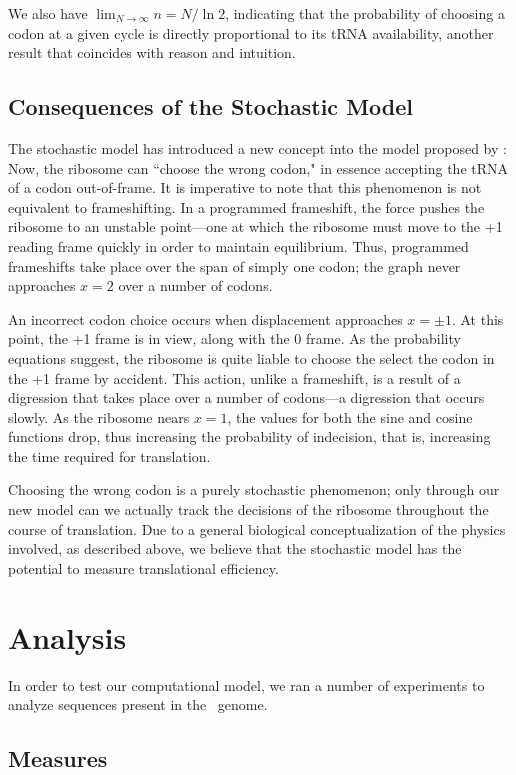 \documentclass[12pt, draft]{article}
\numberwithin{equation}{section}
\begin{document}
We also have $\displaystyle\lim_{N\rightarrow\infty} n = N/\ln{2}$, indicating
that the probability of choosing a codon at a given cycle is directly proportional
to its tRNA availability, another result that coincides with reason and intuition.


\subsection{Consequences of the Stochastic Model}

The stochastic model has introduced a new concept into the model proposed by
\citet{lalit:mechanics}: Now, the ribosome can ``choose the wrong codon," in 
essence accepting the tRNA of a codon out-of-frame.  It is imperative to note
that this phenomenon is not equivalent to frameshifting.  In a programmed
frameshift, the force pushes the ribosome to an unstable point---one at which
the ribosome must move to the +1 reading frame quickly in order to maintain
equilibrium.  Thus, programmed frameshifts take place over the span of simply
one codon; the graph never approaches $x=2$ over a number of codons.

An incorrect codon choice occurs when displacement approaches $x = \pm 1$.
At this point, the +1 frame is in view, along with the 0 frame.  As the probability
equations suggest, the ribosome is quite liable to choose the select the codon
in the +1 frame by accident.  This action, unlike a frameshift, is a result
of a digression that takes place over a number of codons---a digression that
occurs slowly.  As the ribosome nears $x = 1$, the values for both the sine 
and cosine functions drop, thus increasing the probability of indecision, that is,
increasing the time required for translation.

Choosing the wrong codon is a purely stochastic phenomenon; only through our new
model can we actually track the decisions of the ribosome throughout the course
of translation.  Due to a general biological conceptualization of the physics involved,
as described above, we believe that the stochastic model has the potential to 
measure translational efficiency.


\section{Analysis}
In order to test our computational model, we ran a number of
experiments to analyze sequences present in the \ecoli\ genome.

\subsection{Measures}
\label{section:metrics}
\end{document}
